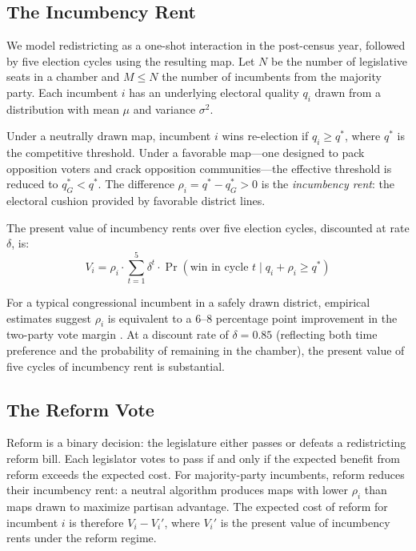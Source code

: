 \subsection{The Incumbency Rent}

We model redistricting as a one-shot interaction in the post-census year, followed by five election cycles using the resulting map. Let $N$ be the number of legislative seats in a chamber and $M \leq N$ the number of incumbents from the majority party. Each incumbent $i$ has an underlying electoral quality $q_i$ drawn from a distribution with mean $\mu$ and variance $\sigma^2$.

Under a neutrally drawn map, incumbent $i$ wins re-election if $q_i \geq q^*$, where $q^*$ is the competitive threshold. Under a favorable map---one designed to pack opposition voters and crack opposition communities---the effective threshold is reduced to $q^*_G < q^*$. The difference $\rho_i = q^* - q^*_G > 0$ is the \emph{incumbency rent}: the electoral cushion provided by favorable district lines.

The present value of incumbency rents over five election cycles, discounted at rate $\delta$, is:
\begin{equation}
  V_i = \rho_i \cdot \sum_{t=1}^{5} \delta^t \cdot \Pr(\text{win in cycle } t \mid q_i + \rho_i \geq q^*)
  \label{eq:rent}
\end{equation}

For a typical congressional incumbent in a safely drawn district, empirical estimates suggest $\rho_i$ is equivalent to a 6--8 percentage point improvement in the two-party vote margin \citep{chen2013}. At a discount rate of $\delta = 0.85$ (reflecting both time preference and the probability of remaining in the chamber), the present value of five cycles of incumbency rent is substantial.

\subsection{The Reform Vote}

Reform is a binary decision: the legislature either passes or defeats a redistricting reform bill. Each legislator votes to pass if and only if the expected benefit from reform exceeds the expected cost. For majority-party incumbents, reform reduces their incumbency rent: a neutral algorithm produces maps with lower $\rho_i$ than maps drawn to maximize partisan advantage. The expected cost of reform for incumbent $i$ is therefore $V_i - V_i'$, where $V_i'$ is the present value of incumbency rents under the reform regime.

